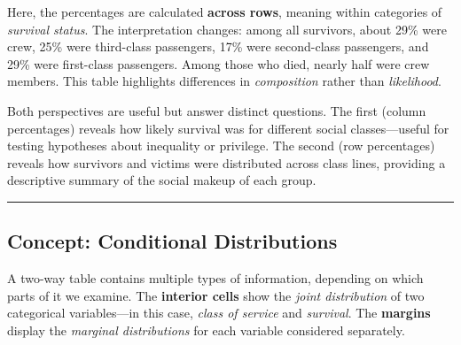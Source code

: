 \documentclass[
  letterpaper,
  DIV=11,
  numbers=noendperiod]{scrreprt}
\begin{document}
Here, the percentages are calculated \textbf{across rows}, meaning
within categories of \emph{survival status}. The interpretation changes:
among all survivors, about 29\% were crew, 25\% were third-class
passengers, 17\% were second-class passengers, and 29\% were first-class
passengers. Among those who died, nearly half were crew members. This
table highlights differences in \emph{composition} rather than
\emph{likelihood}.

Both perspectives are useful but answer distinct questions. The first
(column percentages) reveals how likely survival was for different
social classes---useful for testing hypotheses about inequality or
privilege. The second (row percentages) reveals how survivors and
victims were distributed across class lines, providing a descriptive
summary of the social makeup of each group.

\begin{center}\rule{0.5\linewidth}{0.5pt}\end{center}

\subsection{Concept: Conditional
Distributions}\label{concept-conditional-distributions}

A two-way table contains multiple types of information, depending on
which parts of it we examine. The \textbf{interior cells} show the
\emph{joint distribution} of two categorical variables---in this case,
\emph{class of service} and \emph{survival}. The \textbf{margins}
display the \emph{marginal distributions} for each variable considered
separately.
\end{document}
